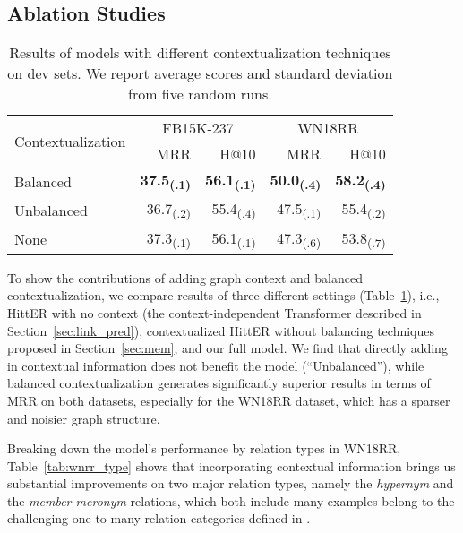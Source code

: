 \documentclass[11pt]{article}
\newcommand{\hit}{HittER\xspace}
\begin{document}
\subsection{Ablation Studies} \label{sec:ablations}
\begin{table}[t]
\setlength{\tabcolsep}{3pt}
\begin{adjustbox}{max width=\linewidth}
\begin{tabular}{lrrrr}
\toprule
\multirow{2}{*}{\normalsize{Contextualization}} & \multicolumn{2}{c}{FB15K-237} & \multicolumn{2}{c}{WN18RR} \\\cmidrule(r{4pt}){2-3} \cmidrule(l){4-5}
                       & MRR           & H@10          & MRR          & H@10        \\\midrule
Balanced            & \textbf{37.5\textsubscript{(.1)}}          & \textbf{56.1\textsubscript{(.1)}}        & \textbf{50.0\textsubscript{(.4)}}        & \textbf{58.2\textsubscript{(.4)}}      \\
Unbalanced                 & 36.7\textsubscript{(.2)}         & 55.4\textsubscript{(.4)}         & 47.5\textsubscript{(.1)}        & 55.4\textsubscript{(.2)}       \\
None             & 37.3\textsubscript{(.1)}         & 56.1\textsubscript{(.1)}         & 47.3\textsubscript{(.6)}        & 53.8\textsubscript{(.7)}     \\\bottomrule
\end{tabular}
\end{adjustbox}
\caption{Results of models with different contextualization techniques on dev sets. We report average scores and standard deviation from five random runs.}
\label{tab:ablations}
\end{table} 
To show the contributions of adding graph context and balanced contextualization, we compare results of three different settings (Table~\ref{tab:ablations}), i.e., \hit{} with no context (the context-independent Transformer described in Section~\ref{sec:link_pred}), contextualized \hit{} without balancing techniques proposed in Section~\ref{sec:mem}, and our full model.
We find that directly adding in contextual information does not benefit the model (``Unbalanced''), while balanced contextualization generates significantly superior results in terms of MRR on both datasets, especially for the WN18RR dataset, which has a sparser and noisier graph structure.


Breaking down the model's performance by relation types in WN18RR, Table~\ref{tab:wnrr_type} shows that incorporating contextual information brings us substantial improvements on two major relation types, namely the \emph{hypernym} and the \emph{member meronym} relations, which both include many examples belong to the challenging one-to-many relation categories defined in \citet{bordes2013transe}.
\end{document}
